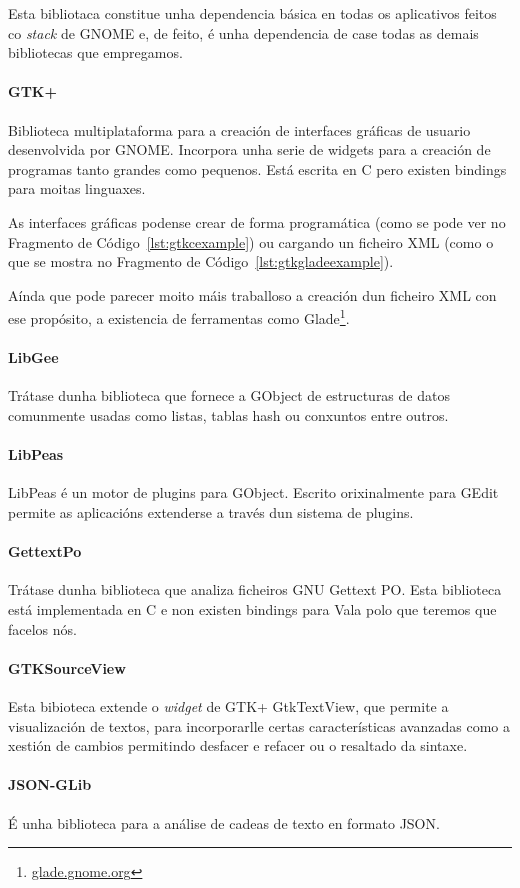Esta bibliotaca constitue unha dependencia básica en todas os aplicativos feitos co \emph{stack} de GNOME e, de feito, é unha dependencia de case todas as demais bibliotecas que empregamos.

\paragraph{GTK+} Biblioteca multiplataforma para a creación de interfaces gráficas de usuario desenvolvida por GNOME. Incorpora unha serie de widgets para a creación de programas tanto grandes como pequenos. Está escrita en C pero existen bindings para moitas linguaxes.



As interfaces gráficas podense crear de forma programática (como se pode ver no Fragmento de Código~\ref{lst:gtkcexample}) ou cargando un ficheiro XML (como o que se mostra no Fragmento de Código~\ref{lst:gtkgladeexample}).



Aínda que pode parecer moito máis traballoso a creación dun ficheiro XML con ese propósito, a existencia de ferramentas como Glade\footnote{\href{http://glade.gnome.org}{glade.gnome.org}}.

\paragraph{LibGee} Trátase dunha biblioteca que fornece a GObject de estructuras de datos comunmente usadas como listas, tablas hash ou conxuntos entre outros.

\paragraph{LibPeas} LibPeas é un motor de plugins para GObject. Escrito orixinalmente para GEdit permite as aplicacións extenderse a través dun sistema de plugins.

\paragraph{GettextPo} Trátase dunha biblioteca que analiza ficheiros GNU Gettext PO. Esta biblioteca está implementada en C e non existen bindings para Vala polo que teremos que facelos nós.

\paragraph{GTKSourceView} Esta bibioteca extende o \emph{widget} de GTK+ GtkTextView, que permite a visualización de textos, para incorporarlle certas características avanzadas como a xestión de cambios permitindo desfacer e refacer ou o resaltado da sintaxe.

\paragraph{JSON-GLib} É unha biblioteca para a análise de cadeas de texto en formato JSON.
